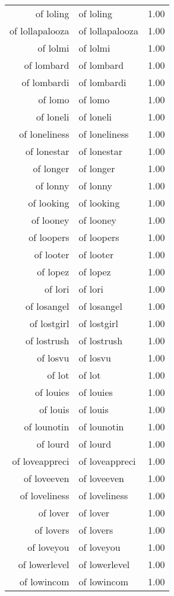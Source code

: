 \begin{table}[ht]
\begin{tabular}{rlr}
  of loling & of loling & 1.00 \\ 
  of lollapalooza & of lollapalooza & 1.00 \\ 
  of lolmi & of lolmi & 1.00 \\ 
  of lombard & of lombard & 1.00 \\ 
  of lombardi & of lombardi & 1.00 \\ 
  of lomo & of lomo & 1.00 \\ 
  of loneli & of loneli & 1.00 \\ 
  of loneliness & of loneliness & 1.00 \\ 
  of lonestar & of lonestar & 1.00 \\ 
  of longer & of longer & 1.00 \\ 
  of lonny & of lonny & 1.00 \\ 
  of looking & of looking & 1.00 \\ 
  of looney & of looney & 1.00 \\ 
  of loopers & of loopers & 1.00 \\ 
  of looter & of looter & 1.00 \\ 
  of lopez & of lopez & 1.00 \\ 
  of lori & of lori & 1.00 \\ 
  of losangel & of losangel & 1.00 \\ 
  of lostgirl & of lostgirl & 1.00 \\ 
  of lostrush & of lostrush & 1.00 \\ 
  of losvu & of losvu & 1.00 \\ 
  of lot & of lot & 1.00 \\ 
  of louies & of louies & 1.00 \\ 
  of louis & of louis & 1.00 \\ 
  of lounotin & of lounotin & 1.00 \\ 
  of lourd & of lourd & 1.00 \\ 
  of loveappreci & of loveappreci & 1.00 \\ 
  of loveeven & of loveeven & 1.00 \\ 
  of loveliness & of loveliness & 1.00 \\ 
  of lover & of lover & 1.00 \\ 
  of lovers & of lovers & 1.00 \\ 
  of loveyou & of loveyou & 1.00 \\ 
  of lowerlevel & of lowerlevel & 1.00 \\ 
  of lowincom & of lowincom & 1.00 \\ 

\end{tabular}
\end{table}
